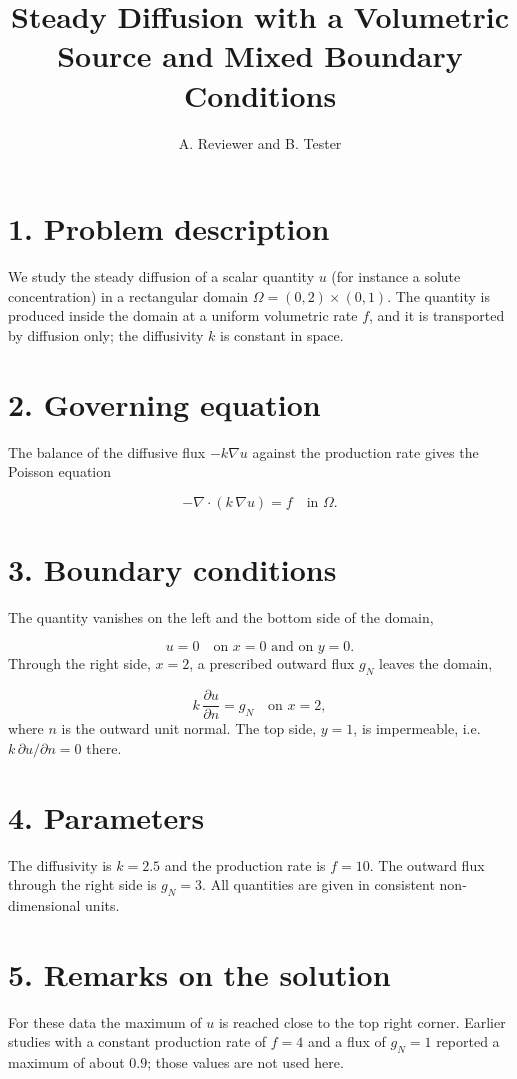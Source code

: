 \documentclass[11pt,a4paper]{article}
\title{Steady Diffusion with a Volumetric Source and Mixed Boundary Conditions}\author{A. Reviewer and B. Tester}\date{}
\begin{document}
\maketitle
\section*{1. Problem description}
We study the steady diffusion of a scalar quantity $u$ (for instance a solute concentration) in a rectangular domain $\Omega=(0,2)\times(0,1)$. The quantity is produced inside the domain at a uniform volumetric rate $f$, and it is transported by diffusion only; the diffusivity $k$ is constant in space.

\section*{2. Governing equation}
The balance of the diffusive flux $-k\nabla u$ against the production rate gives the Poisson equation

\begin{equation}
-\nabla\cdot\left(k\,\nabla u\right) = f \quad \text{in } \Omega .
\end{equation}
\section*{3. Boundary conditions}
The quantity vanishes on the left and the bottom side of the domain,

\begin{equation}
u = 0 \quad \text{on } x=0 \text{ and on } y=0 .
\end{equation}
Through the right side, $x=2$, a prescribed outward flux $g_N$ leaves the domain,

\begin{equation}
k\,\frac{\partial u}{\partial n} = g_N \quad \text{on } x=2 ,
\end{equation}
where $n$ is the outward unit normal. The top side, $y=1$, is impermeable, i.e. $k\,\partial u/\partial n = 0$ there.

\section*{4. Parameters}
The diffusivity is $k=2.5$ and the production rate is $f=10$. The outward flux through the right side is $g_N=3$. All quantities are given in consistent non-dimensional units.

\section*{5. Remarks on the solution}
For these data the maximum of $u$ is reached close to the top right corner. Earlier studies with a constant production rate of $f=4$ and a flux of $g_N=1$ reported a maximum of about $0.9$; those values are not used here.
\end{document}
